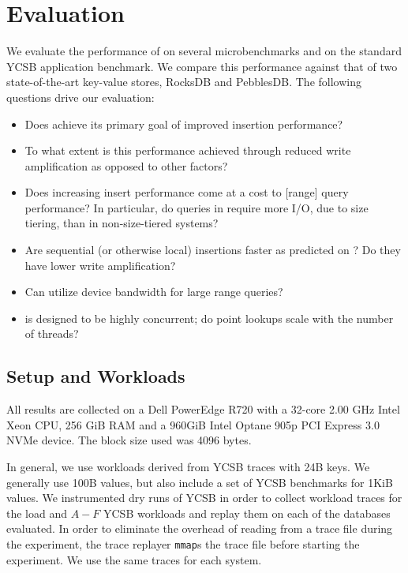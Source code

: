 \section{Evaluation}\label{sec:eval}

We evaluate the performance of \sysname{} on several microbenchmarks and on the
standard YCSB application benchmark\cite{DBLP:conf/cloud/CooperSTRS10}. We
compare this performance against that of two state-of-the-art key-value stores,
RocksDB and PebblesDB.  The following questions drive our evaluation:
\begin{itemize}
   \item Does \sysname achieve its primary goal of improved insertion
      performance?
   \item To what extent is this performance achieved through reduced write
      amplification as opposed to other factors?
   \item Does increasing insert performance come at a cost to [range] query
     performance?  In particular, do queries in \sysname require more I/O, due to
     size tiering, than in non-size-tiered systems?
   \item Are sequential (or otherwise local) insertions faster as predicted on
     \sysname? Do they have lower write amplification?
   \item Can \sysname utilize device bandwidth for large range queries?
   \item \sysname is designed to be highly concurrent; do point lookups scale
      with the number of threads?
\end{itemize}

\subsection{Setup and Workloads}\label{sec:setup}

All results are collected on a Dell PowerEdge R720 with a 32-core
2.00 GHz Intel Xeon CPU, 256 GiB RAM and a 960GiB Intel Optane 905p PCI Express
3.0 NVMe device. The block size used was 4096 bytes.

In general, we use workloads derived from YCSB traces with 24B keys. We
generally use 100B values, but also include a set of YCSB benchmarks for 1KiB
values.  We instrumented dry runs of YCSB in order to collect workload traces
for the load and $A-F$ YCSB workloads and replay them on each of the databases
evaluated.  In order to eliminate the overhead of reading from a trace file
during the experiment, the trace replayer \texttt{mmap}s the trace file before
starting the experiment.  We use the same traces for each system.

